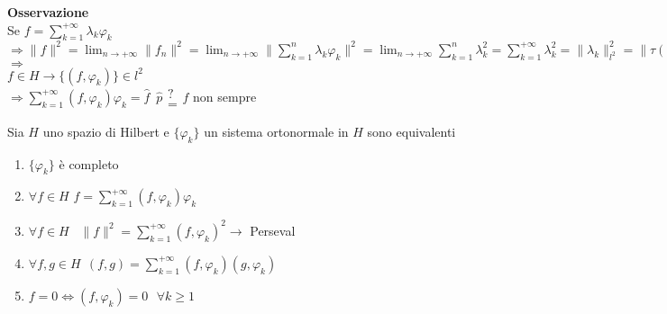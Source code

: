 \documentclass[12px]{article}
\begin{document}
\textbf{Osservazione}\\
Se $f = \sum^{ + \infty}_{k = 1} \lambda_k \varphi_k$\\
$\displaystyle \Rightarrow  \|f\|^2 = \lim_{n \rightarrow +\infty} \|f_n\|^2 = \lim_{ n \rightarrow +\infty}\| \sum^{n}_{k=1} \lambda_k \varphi_k \|^2 = \lim_{ n \rightarrow +\infty}  \sum^{n}_{k=1} \lambda_k^2 = \sum^{+\infty}_{k = 1} \lambda_k^2 = \| \lambda_k\|^2_{l^2} = \|\tau(f)\|^2_{l^2}$\\
$ \Rightarrow $ \\
$f\in H \rightarrow \{(f, \varphi_k)\}\in l^2$\\
$ \Rightarrow  \sum^{+\infty}_{k = 1}(f, \varphi_k) \varphi_k = \hat f$\
$\hat p \substack{?\\ =} f$ non sempre
 \begin{teo}
	 Sia $H$ uno spazio di Hilbert e $\{ \varphi_k \}$ un sistema ortonormale in $H$ sono equivalenti
	 \begin{enumerate}
		 \item $\{ \varphi_k\}$ è completo
		 \item $\forall f\in H$  $f = \sum^{+\infty}_{k = 1} (f, \varphi_k) \varphi_k$
		 \item $\forall f\in H$ \  $\|f\|^2 = \sum^{+\infty}_{k = 1}(f, \varphi_k)^2 \rightarrow $ Perseval
		 \item $\forall f,g\in H \ \ (f,g) = \sum^{+\infty}_{k = 1}(f, \varphi_k)(g, \varphi_k)$
		 \item $f = 0 \Leftrightarrow (f, \varphi_k) = 0 \ \ \ \forall k \geq 1$
	 \end{enumerate}
\end{teo}
\end{document}
